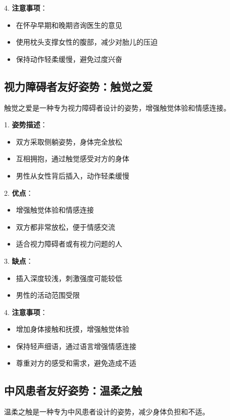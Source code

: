 \documentclass[12pt,UTF8]{ctexbook}
\begin{document}
4. \textbf{注意事项}：
  \begin{itemize}
  \item 在怀孕早期和晚期咨询医生的意见
  \item 使用枕头支撑女性的腹部，减少对胎儿的压迫
  \item 保持动作轻柔缓慢，避免过度兴奋
  \end{itemize}

\subsection{视力障碍者友好姿势：触觉之爱}

触觉之爱是一种专为视力障碍者设计的姿势，增强触觉体验和情感连接。

1. \textbf{姿势描述}：
  \begin{itemize}
  \item 双方采取侧躺姿势，身体完全放松
  \item 互相拥抱，通过触觉感受对方的身体
  \item 男性从女性背后插入，动作轻柔缓慢
  \end{itemize}

2. \textbf{优点}：
  \begin{itemize}
  \item 增强触觉体验和情感连接
  \item 双方都非常放松，便于情感交流
  \item 适合视力障碍者或有视力问题的人
  \end{itemize}

3. \textbf{缺点}：
  \begin{itemize}
  \item 插入深度较浅，刺激强度可能较低
  \item 男性的活动范围受限
  \end{itemize}

4. \textbf{注意事项}：
  \begin{itemize}
  \item 增加身体接触和抚摸，增强触觉体验
  \item 保持轻声细语，通过语言增强情感连接
  \item 尊重对方的感受和需求，避免造成不适
  \end{itemize}

\subsection{中风患者友好姿势：温柔之触}

温柔之触是一种专为中风患者设计的姿势，减少身体负担和不适。
\end{document}
